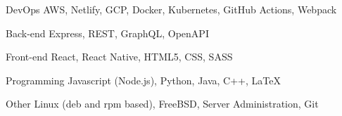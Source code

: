 

\begin{cvskills}

  \cvskill
    {DevOps} %
    {AWS, Netlify, GCP, Docker, Kubernetes, GitHub Actions, Webpack} %

  \cvskill
    {Back-end} %
    {Express, REST, GraphQL, OpenAPI} %

  \cvskill
    {Front-end} %
    {React, React Native, HTML5, CSS, SASS} %

  \cvskill
    {Programming} %
    {Javascript (Node.js), Python, Java, C++, LaTeX} %

  \cvskill
    {Other} %
    {Linux (deb and rpm based), FreeBSD, Server Administration, Git} %


\end{cvskills}

